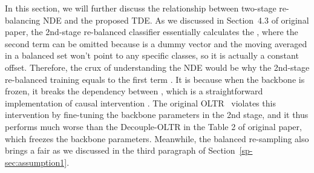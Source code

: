 \documentclass{article}
\begin{document}
In this section, we will further discuss the relationship between two-stage re-balancing NDE and the proposed TDE. As we discussed in Section~4.3 of original paper, the 2nd-stage re-balanced classifier essentially calculates the , where the second term can be omitted because  is a dummy vector and the moving averaged  in a balanced set won't point to any specific classes, so it is actually a constant offset. Therefore, the crux of understanding the NDE would be why the 2nd-stage re-balanced training equals to the first term . It is because when the backbone is frozen, it breaks the dependency between , which is a straightforward implementation of causal intervention . The original OLTR~\cite{liu2019large} violates this intervention by fine-tuning the backbone parameters in the 2nd stage, and it thus performs much worse than the Decouple-OLTR in the Table 2 of original paper, which freezes the backbone parameters. Meanwhile, the balanced re-sampling also brings a fair  as we discussed in the third paragraph of Section~\ref{sp-sec:assumption1}.
\end{document}
